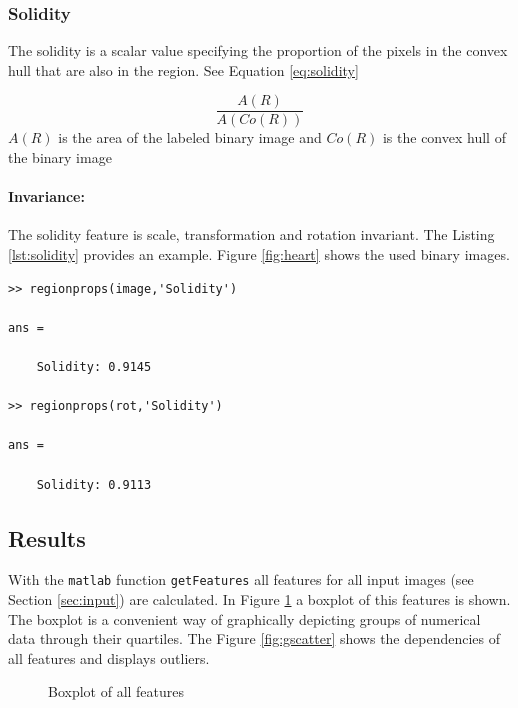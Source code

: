 \documentclass[a4paper,psfig,subfigure,epsfig,fleqn,amssmb,float,caption,fontenc,ausarbeitung]{article}
\begin{document}
\subsubsection{Solidity}
\label{sec:solidity}

The solidity is a scalar value specifying the proportion of the pixels in the 
convex hull that are also in the region. See Equation \ref{eq:solidity}

\begin{equation}
\frac{A(R)}{A(Co(R))}
\label{eq:solidity}
\end{equation}
$A(R)$ is the area of the labeled binary image and $Co(R)$ is the convex hull of the binary image

\paragraph{Invariance:} The solidity feature is scale, transformation and 
rotation invariant. The Listing \ref{lst:solidity} provides an example. 
Figure \ref{fig:heart} shows the used binary images.
\begin{lstlisting}[caption=Calculate solidity in matlab, label=lst:solidity]
>> regionprops(image,'Solidity')

ans = 

    Solidity: 0.9145

>> regionprops(rot,'Solidity')

ans = 

    Solidity: 0.9113
\end{lstlisting}

\subsection{Results}

With the {\tt matlab} function {\tt getFeatures} all features for all input 
images (see Section \ref{sec:input}) are calculated. In Figure \ref{fig:boxplot} 
a boxplot  of this features is shown. The boxplot is a convenient way of 
graphically depicting groups of numerical data through their quartiles. 
\cite{tukey1977exploratory}
The Figure \ref{fig:gscatter} shows the dependencies of all features and displays outliers.

\begin{figure}
	\centering
	\newlength\figureheight 
	\newlength\figurewidth 
	\setlength\figureheight{6cm} 
	\setlength\figurewidth{10cm}
	
	\caption{Boxplot of all features}
	\label{fig:boxplot}
\end{figure}
\end{document}
